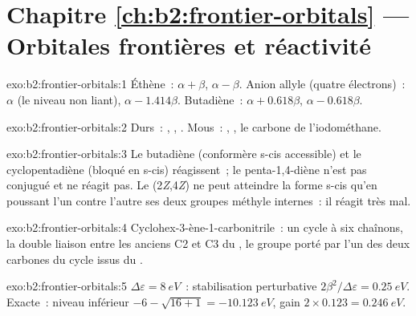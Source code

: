 \section*{Chapitre \ref{ch:b2:frontier-orbitals} --- Orbitales frontières et réactivité}

\begin{solution}{exo:b2:frontier-orbitals:1}
Éthène~:  $\alpha + \beta$,  $\alpha - \beta$. Anion allyle (quatre électrons)~:  $\alpha$ (le
niveau non liant),  $\alpha - 1.414\beta$. Butadiène~:  $\alpha + 0.618\beta$,  $\alpha -
0.618\beta$.
\end{solution}

\begin{solution}{exo:b2:frontier-orbitals:2}
Durs~: , , . Mous~: , , le carbone de l'iodométhane.
\end{solution}

\begin{solution}{exo:b2:frontier-orbitals:3}
Le butadiène (conformère s-cis accessible) et le cyclopentadiène (bloqué en s-cis) réagissent~;
le penta-1,4-diène n'est pas conjugué et ne réagit pas. Le  (2\textit{Z},4\textit{Z}) ne peut
atteindre la forme s-cis qu'en poussant l'un contre l'autre ses deux groupes méthyle internes~: il
réagit très mal.
\end{solution}

\begin{solution}{exo:b2:frontier-orbitals:4}
Cyclohex-3-ène-1-carbonitrile~: un cycle à six chaînons, la double liaison entre les anciens C2
et C3 du , le groupe  porté par l'un des deux carbones du cycle issus du
.
\end{solution}

\begin{solution}{exo:b2:frontier-orbitals:5}
$\Delta\varepsilon = \qty{8}{eV}$~: stabilisation perturbative $2\beta^2/\Delta\varepsilon = \qty{0.25}{eV}$. Exacte~: niveau inférieur
$-6 - \sqrt{16 + 1} = \qty{-10.123}{eV}$, gain $2 \times 0.123 = \qty{0.246}{eV}$.
\end{solution}

